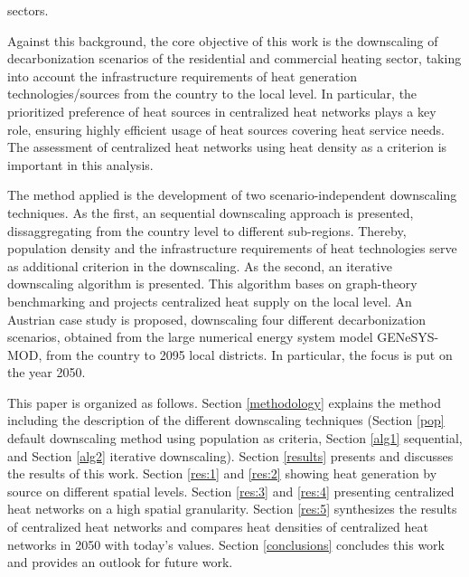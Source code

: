 sectors.\newline

Against this background, the core objective of this work is the downscaling of decarbonization scenarios of the residential and commercial heating sector, taking into account the infrastructure requirements of heat generation technologies/sources from the country to the local level. In particular, the prioritized preference of heat sources in centralized heat networks plays a key role, ensuring highly efficient usage of heat sources covering heat service needs. The assessment of centralized heat networks using heat density as a criterion is important in this analysis.\newline

The method applied is the development of two scenario-independent downscaling techniques. As the first, an sequential downscaling approach is presented, dissaggregating from the country level to different sub-regions. Thereby, population density and the infrastructure requirements of heat technologies serve as additional criterion in the downscaling. As the second, an iterative downscaling algorithm is presented. This algorithm bases on graph-theory benchmarking and projects centralized heat supply on the local level. An Austrian case study is proposed, downscaling four different decarbonization scenarios, obtained from the large numerical energy system model GENeSYS-MOD, from the country to 2095 local districts. In particular, the focus is put on the year 2050.\newline 

This paper is organized as follows. Section \ref{methodology} explains the method including the description of the different downscaling techniques (Section \ref{pop} default downscaling method using population as criteria, Section \ref{alg1} sequential, and Section \ref{alg2} iterative downscaling). Section \ref{results} presents and discusses the results of this work. Section \ref{res:1} and \ref{res:2} showing heat generation by source on different spatial levels. Section \ref{res:3} and \ref{res:4} presenting centralized heat networks on a high spatial granularity. Section \ref{res:5} synthesizes the results of centralized heat networks and compares heat densities of centralized heat networks in 2050 with today's values. Section \ref{conclusions} concludes this work and provides an outlook for future work. 